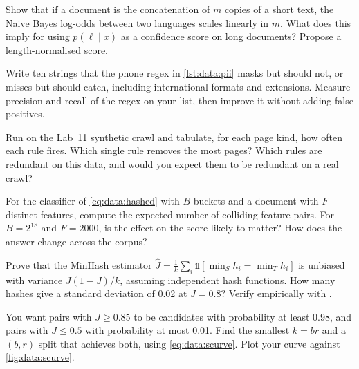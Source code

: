 \begin{exercise}
Show that if a document is the concatenation of $m$ copies of a short text, the Naive Bayes
log-odds between two languages scales linearly in $m$. What does this imply for using
$p(\ell\mid x)$ as a confidence score on long documents? Propose a length-normalised score.
\end{exercise}

\begin{exercise}
Write ten strings that the phone regex in \cref{lst:data:pii} masks but should not, or misses
but should catch, including international formats and extensions. Measure precision and recall
of the regex on your list, then improve it without adding false positives.
\end{exercise}

\begin{exercise}
Run  on the Lab~11 synthetic crawl and tabulate, for each page kind, how
often each rule fires. Which single rule removes the most pages? Which rules are redundant on
this data, and would you expect them to be redundant on a real crawl?
\end{exercise}

\begin{exercise}
For the classifier of \cref{eq:data:hashed} with $B$ buckets and a document with $F$ distinct
features, compute the expected number of colliding feature pairs. For $B=2^{18}$ and $F=2000$, is
the effect on the score likely to matter? How does the answer change across the corpus?
\end{exercise}

\begin{exercise}
Prove that the MinHash estimator $\hat J = \frac1k\sum_i \mathbb{1}[\min_S h_i=\min_T h_i]$ is
unbiased with variance $J(1-J)/k$, assuming independent hash functions. How many hashes give a
standard deviation of 0.02 at $J=0.8$? Verify empirically with .
\end{exercise}

\begin{exercise}
You want pairs with $J\ge0.85$ to be candidates with probability at least 0.98, and pairs with
$J\le0.5$ with probability at most 0.01. Find the smallest $k=br$ and a $(b,r)$ split that achieves
both, using \cref{eq:data:scurve}. Plot your curve against \cref{fig:data:scurve}.
\end{exercise}


